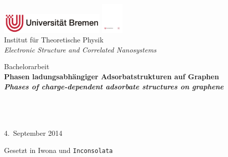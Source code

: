 \documentclass[a4paper, 10pt, twoside, openany]{book} %
\begin{document}
\frontmatter


\begin{titlepage}
    \centering

    \normalsize
    \includegraphics[width=5cm]{Abbildungen/Uni.pdf} \hfill \includegraphics[height=1.5cm]{Abbildungen/ITP.pdf} \\
    \hfill Institut für Theoretische Physik \\
    \hfill \emph{Electronic Structure and Correlated Nanosystems}

    \vfill

    \Large
    Bachelorarbeit \\[3pc]

    \bf \Huge
    Phasen ladungsabhängiger Adsorbatstrukturen auf Graphen \\[3pc]

    \it \normalsize
    Phases of charge-dependent adsorbate structures on graphene

    \vfill

    \normalfont \large
    \hspace{0cm}\hspace{1pc} \\[1pc]
    \hspace{0cm}\hspace{1pc} \\
    \hspace{0cm}\hspace{1pc} \\[2pc]

    4.~September 2014

    \vfill
\end{titlepage}


\tableofcontents

\vfill

\begin{flushright}
    \footnotesize
    Gesetzt in Iwona und \texttt{Inconsolata}
\end{flushright}
\end{document}
